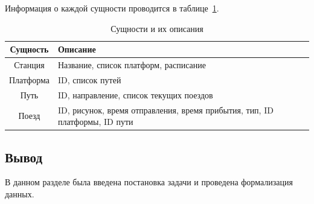 Информация о каждой сущности проводится в таблице~\ref{tb:data}.

\begin{table}[ht]
	\begin{center}
		\begin{threeparttable}
			\caption{\label{tb:data} Сущности и их описания}
			\begin{tabular}{|c|p{10cm}|}
				\hline
				\textbf{Сущность} & \textbf{Описание} \\ \hline
				Станция & Название, список платформ, расписание \\ \hline
				Платформа & ID, список путей \\ \hline
				Путь & ID, направление, список текущих поездов \\ \hline
				Поезд & ID, рисунок, время отправления, время прибытия, тип, ID платформы, ID пути \\ \hline
			\end{tabular}
		\end{threeparttable}
	\end{center}
\end{table}

\subsection*{Вывод}
В данном разделе была введена постановка задачи и проведена формализация данных.
